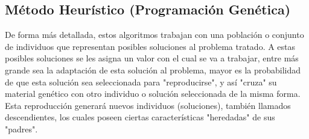 \subsection{Método Heurístico (Programación Genética)}
 De forma más detallada, estos algoritmos trabajan con una población o conjunto de individuos que representan posibles soluciones al problema tratado. A estas posibles soluciones se les asigna un valor con el cual se va a trabajar, entre más grande sea la adaptación de esta solución al problema, mayor es la probabilidad de que esta solución sea seleccionada para "reproducirse", y así "cruza" su material genético con otro individuo o solución seleccionada de la misma forma. Esta reproducción generará nuevos individuos (soluciones), también llamados descendientes, los cuales poseen ciertas características "heredadas" de sus "padres"\cite{R12}. 

